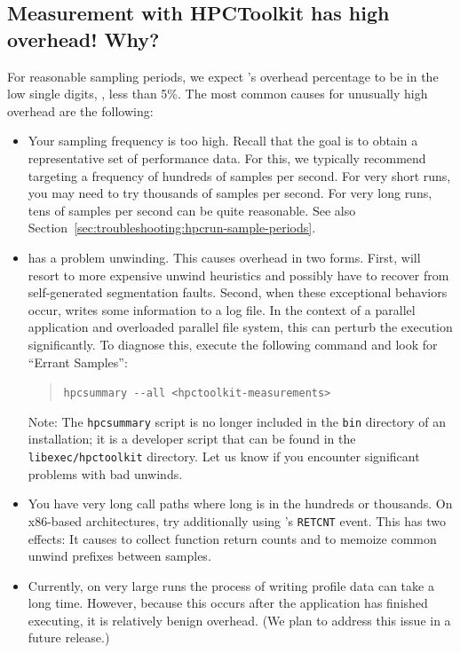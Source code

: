\documentclass[11pt,twoside,letterpaper]{report}
\begin{document}
\subsection{Measurement with HPCToolkit has high overhead! Why?}

For reasonable sampling periods, we expect \hpcrun{}'s overhead percentage to be in the low single digits, \eg{}, less than 5\%.
The most common causes for unusually high overhead are the following:
\begin{itemize}

\item Your sampling frequency is too high.
  Recall that the goal is to obtain a representative set of performance data.
  For this, we typically recommend targeting a frequency of hundreds of samples per second.
  For very short runs, you may need to try thousands of samples per second.
  For very long runs, tens of samples per second can be quite reasonable.
  See also Section~\ref{sec:troubleshooting:hpcrun-sample-periods}.

\item \hpcrun{} has a problem unwinding.
  This causes overhead in two forms.
  First, \hpcrun{} will resort to more expensive unwind heuristics and possibly have to recover from self-generated segmentation faults.
  Second, when these exceptional behaviors occur, \hpcrun{} writes some information to a log file.
  In the context of a parallel application and overloaded parallel file system, this can perturb the execution significantly.
  To diagnose this, execute the following command and look for ``Errant Samples'':
  \begin{quote}
  \verb|hpcsummary --all <hpctoolkit-measurements>|
  \end{quote}
  Note: The \verb|hpcsummary| script is no longer included in the \verb|bin| directory of an \HPCToolkit{} installation;
  it is a developer script that can be found in the \verb|libexec/hpctoolkit| directory.
  Let us know if you encounter significant problems with bad unwinds.

\item You have very long call paths where long is in the hundreds or thousands.
  On x86-based architectures, try additionally using \hpcrun{}'s \texttt{RETCNT} event.
  This has two effects: It causes \hpcrun{} to collect function return counts and to memoize common unwind prefixes between samples.

\item Currently, on very large runs the process of writing profile data can take a long time.
  However, because this occurs after the application has finished executing, it is relatively benign overhead.
  (We plan to address this issue in a future release.)

\end{itemize}
\end{document}
